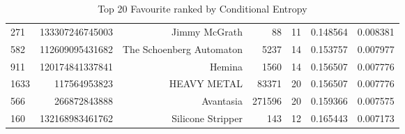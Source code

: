 \begin{table}
\begin{tabular}{| >{\small}l | >{\small}r | >{\small}r | >{\small}r | >{\small}r | >{\small}r |>{\small}r |}
271  &  133307246745003 &             Jimmy McGrath &      88 &       11 &             0.148564 &            0.008381 \\
582  &  112609095431682 &  The Schoenberg Automaton &    5237 &       14 &             0.153757 &            0.007977 \\
911  &  120174841337841 &                    Hemina &    1560 &       14 &             0.156507 &            0.007776 \\
1633 &     117564953823 &               HEAVY METAL &   83371 &       20 &             0.156507 &            0.007776 \\
566  &     266872843888 &                 Avantasia &  271596 &       20 &             0.159366 &            0.007575 \\
160  &  132168983461762 &         Silicone Stripper &     143 &       12 &             0.165443 &            0.007173 \\
\hline
\end{tabular}
\caption{Top 20 Favourite ranked by Conditional Entropy}
\label {Top 20 Favourite ranked by Conditional Entropy}
\end{table}
	
